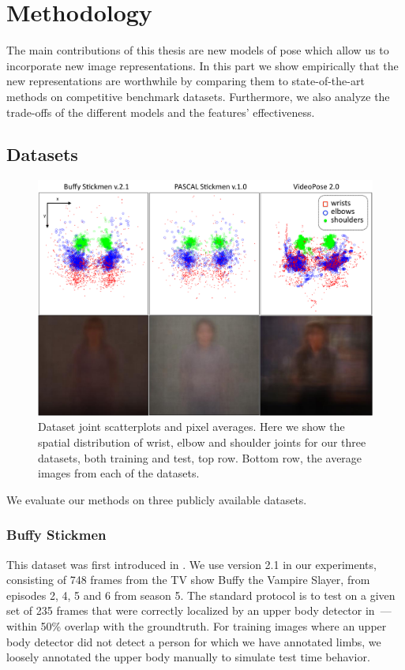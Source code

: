 \chapter{Methodology}
The main contributions of this thesis are new models of pose which allow us to 
incorporate new image representations.  In this part we show empirically that the new 
representations are worthwhile by comparing them to state-of-the-art methods on 
competitive benchmark datasets.  Furthermore, we also analyze the trade-offs of 
the different models and the features' effectiveness.

\section{Datasets}\label{sec:datasets}
\begin{figure}[tb]
\begin{center}
\includegraphics[width=1.05\textwidth]{figs/dataset-scatterplots.pdf}
\caption[Dataset joint scatterplots and pixel averages.]{Dataset joint 
scatterplots and pixel averages.  Here we show the spatial distribution of 
wrist, elbow and shoulder joints for our three datasets, both training and 
test, top row.  Bottom row, the average images from each of the datasets.}
\label{fig:dataset-scatterplots}
\end{center}
\end{figure}



We evaluate our methods on three publicly available datasets.

\subsection{Buffy Stickmen}
This dataset was first introduced in \citet{ferrari08}.  We use version 2.1 in 
our experiments, consisting of 748 frames from the TV show Buffy the Vampire 
Slayer, from episodes 2, 4, 5 and 6 from season 5.  The standard protocol is to 
test on a given set of 235 frames that were correctly localized by an upper 
body detector in~\citet{ferrari08}---within 50\% overlap with the groundtruth.  
For training images where an upper body detector did not detect a person for 
which we have annotated limbs, we loosely annotated the upper body manually to 
simulate test time behavior.
  

